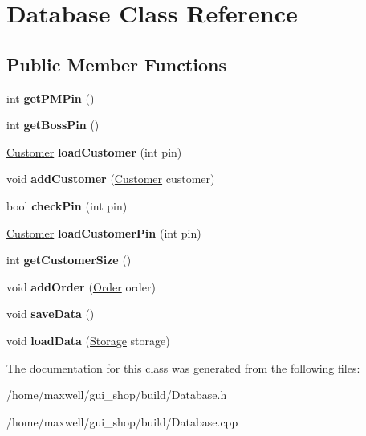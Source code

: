 \hypertarget{classDatabase}{}\section{Database Class Reference}
\label{classDatabase}
\subsection*{Public Member Functions}
\begin{DoxyCompactItemize}
\item 
int {\bfseries get\+P\+M\+Pin} ()\hypertarget{classDatabase_a2f14c252c25a8c19bdb960f5890c4863}{}\label{classDatabase_a2f14c252c25a8c19bdb960f5890c4863}

\item 
int {\bfseries get\+Boss\+Pin} ()\hypertarget{classDatabase_af38c09e944a2511a983787497db1238a}{}\label{classDatabase_af38c09e944a2511a983787497db1238a}

\item 
\hyperlink{classCustomer}{Customer} {\bfseries load\+Customer} (int pin)\hypertarget{classDatabase_a246fc85e016526146820912fbd1b5a7a}{}\label{classDatabase_a246fc85e016526146820912fbd1b5a7a}

\item 
void {\bfseries add\+Customer} (\hyperlink{classCustomer}{Customer} customer)\hypertarget{classDatabase_a2afca0cc455a5c12ae2905a8900012e8}{}\label{classDatabase_a2afca0cc455a5c12ae2905a8900012e8}

\item 
bool {\bfseries check\+Pin} (int pin)\hypertarget{classDatabase_a30f198c1fca9a5a9dc4931740a2362a9}{}\label{classDatabase_a30f198c1fca9a5a9dc4931740a2362a9}

\item 
\hyperlink{classCustomer}{Customer} {\bfseries load\+Customer\+Pin} (int pin)\hypertarget{classDatabase_a8152db1c1e7f204ae8a5176f87641478}{}\label{classDatabase_a8152db1c1e7f204ae8a5176f87641478}

\item 
int {\bfseries get\+Customer\+Size} ()\hypertarget{classDatabase_a42fdd4aec54f0345304a6eb97f3ea887}{}\label{classDatabase_a42fdd4aec54f0345304a6eb97f3ea887}

\item 
void {\bfseries add\+Order} (\hyperlink{classOrder}{Order} order)\hypertarget{classDatabase_ad5a3b7a09c8ba009dc46c4d8a3e54954}{}\label{classDatabase_ad5a3b7a09c8ba009dc46c4d8a3e54954}

\item 
void {\bfseries save\+Data} ()\hypertarget{classDatabase_a4bfbcd31b36245c9a26b72df1d981e47}{}\label{classDatabase_a4bfbcd31b36245c9a26b72df1d981e47}

\item 
void {\bfseries load\+Data} (\hyperlink{classStorage}{Storage} storage)\hypertarget{classDatabase_a292b82b6274b9b1e50154e76d3d67174}{}\label{classDatabase_a292b82b6274b9b1e50154e76d3d67174}

\end{DoxyCompactItemize}


The documentation for this class was generated from the following files\+:\begin{DoxyCompactItemize}
\item 
/home/maxwell/gui\+\_\+shop/build/Database.\+h\item 
/home/maxwell/gui\+\_\+shop/build/Database.\+cpp\end{DoxyCompactItemize}
